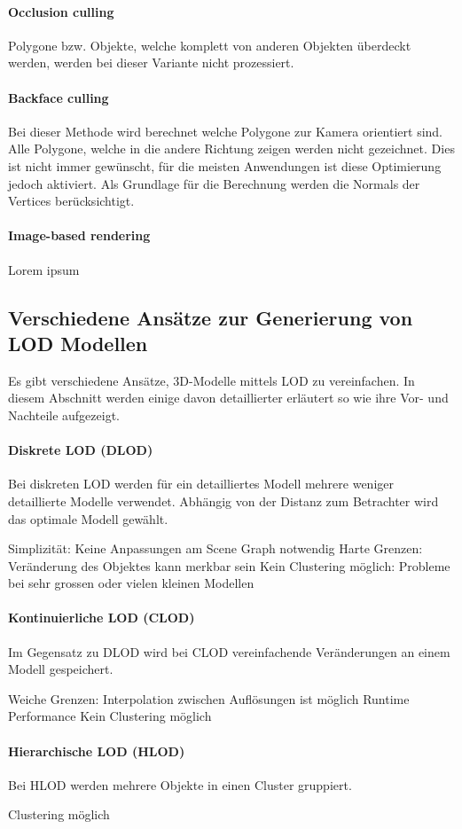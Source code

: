 \paragraph{Occlusion culling}
Polygone bzw. Objekte, welche komplett von anderen Objekten überdeckt werden, werden bei dieser Variante nicht prozessiert.

\paragraph{Backface culling}
\label{chap:backfaceCulling}
Bei dieser Methode wird berechnet welche Polygone zur Kamera orientiert sind.
Alle Polygone, welche in die andere Richtung zeigen werden nicht gezeichnet.
Dies ist nicht immer gewünscht, für die meisten Anwendungen ist diese Optimierung jedoch aktiviert.
Als Grundlage für die Berechnung werden die Normals der Vertices berücksichtigt.

\paragraph{Image-based rendering}
Lorem ipsum


\subsection{Verschiedene Ansätze zur Generierung von LOD Modellen}
Es gibt verschiedene Ansätze, 3D-Modelle mittels LOD zu vereinfachen. In diesem Abschnitt werden einige davon detaillierter erläutert so wie ihre Vor- und Nachteile aufgezeigt.

\paragraph{Diskrete LOD (DLOD)}
Bei diskreten LOD werden für ein detailliertes Modell mehrere weniger detaillierte Modelle verwendet.
Abhängig von der Distanz zum Betrachter wird das optimale Modell gewählt.
\begin{itemize}
  \pro Simplizität: Keine Anpassungen am Scene Graph notwendig
  \con Harte Grenzen: Veränderung des Objektes kann merkbar sein
  \con Kein Clustering möglich: Probleme bei sehr grossen oder vielen kleinen Modellen
\end{itemize}

\paragraph{Kontinuierliche LOD (CLOD)}
Im Gegensatz zu DLOD wird bei CLOD vereinfachende Veränderungen an einem Modell gespeichert.
\begin{itemize}
  \pro Weiche Grenzen: Interpolation zwischen Auflösungen ist möglich
  \con Runtime Performance
  \con Kein Clustering möglich
\end{itemize}

\paragraph{Hierarchische LOD (HLOD)}
Bei HLOD werden mehrere Objekte in einen Cluster gruppiert.
\begin{itemize}
  \pro Clustering möglich
\end{itemize}
